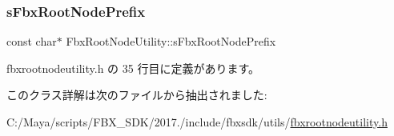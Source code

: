 \subsubsection{\texorpdfstring{s\+Fbx\+Root\+Node\+Prefix}{sFbxRootNodePrefix}}
{\footnotesize\ttfamily const char$\ast$ Fbx\+Root\+Node\+Utility\+::s\+Fbx\+Root\+Node\+Prefix\hspace{0.3cm}{\ttfamily [static]}}



 fbxrootnodeutility.\+h の 35 行目に定義があります。



このクラス詳解は次のファイルから抽出されました\+:\begin{DoxyCompactItemize}
\item 
C\+:/\+Maya/scripts/\+F\+B\+X\+\_\+\+S\+D\+K/2017./include/fbxsdk/utils/\hyperlink{fbxrootnodeutility_8h}{fbxrootnodeutility.\+h}\end{DoxyCompactItemize}
